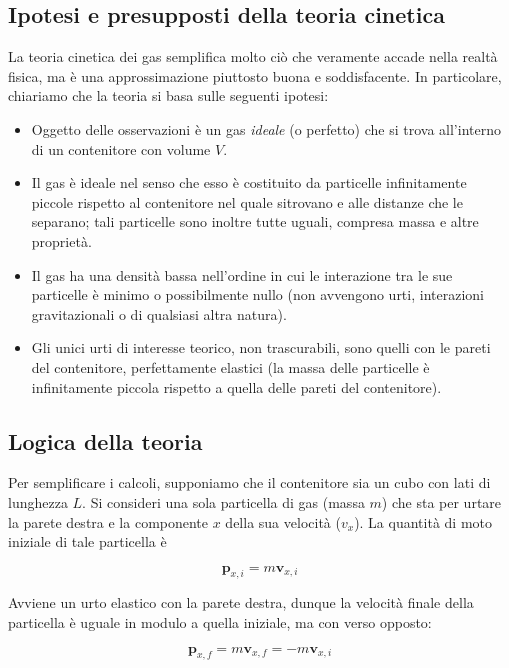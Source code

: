 \subsection*{Ipotesi e presupposti della teoria cinetica}
La teoria cinetica dei gas semplifica molto ciò che veramente accade
nella realtà fisica, ma è una approssimazione piuttosto buona e
soddisfacente. In particolare, chiariamo che la teoria si basa sulle
seguenti ipotesi:
\begin{itemize}
    \item Oggetto delle osservazioni è un gas \textit{ideale} (o
    perfetto) che si trova all'interno di un contenitore con volume
    $V$.

    \item Il gas è ideale nel senso che esso è costituito da
    particelle infinitamente piccole rispetto al contenitore nel
    quale sitrovano e alle distanze che le separano; tali particelle
    sono inoltre tutte uguali, compresa massa e altre proprietà.

    \item Il gas ha una densità bassa nell'ordine in cui le interazione
    tra le sue particelle è minimo o possibilmente nullo (non avvengono
    urti, interazioni gravitazionali o di qualsiasi altra natura).

    \item Gli unici urti di interesse teorico, non trascurabili, sono
    quelli con le pareti del contenitore, perfettamente elastici (la
    massa delle particelle è infinitamente piccola rispetto a quella
    delle pareti del contenitore).
\end{itemize}

\subsection*{Logica della teoria}
Per semplificare i calcoli, supponiamo che il contenitore sia un
cubo con lati di lunghezza $L$. Si consideri una sola particella
di gas (massa $m$) che sta per urtare la parete destra e la componente $x$
della sua velocità ($v_x$). La quantità di moto iniziale di tale particella
è

\[ \mathbf{p}_{x,i} = m\textbf{v}_{x,i} \]

Avviene un urto elastico con la parete destra, dunque la velocità finale
della particella è uguale in modulo a quella iniziale, ma con verso
opposto:

\[ \mathbf{p}_{x,f} = m\textbf{v}_{x,f} = -m\textbf{v}_{x,i} \]

